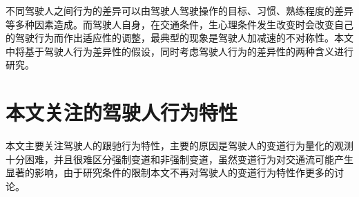 不同驾驶人之间行为的差异可以由驾驶人驾驶操作的目标、习惯、熟练程度的差异等多种因素造成。而驾驶人自身，在交通条件，生心理条件发生改变时会改变自己的驾驶行为而作出适应性的调整，最典型的现象是驾驶人加减速的不对称性。本文中将基于驾驶人行为差异性的假设，同时考虑驾驶人行为的差异性的两种含义进行研究。
%
%
%
%
%
%

\section{本文关注的驾驶人行为特性}

本文主要关注驾驶人的跟驰行为特性，主要的原因是驾驶人的变道行为量化的观测十分困难，并且很难区分强制变道和非强制变道，虽然变道行为对交通流可能产生显著的影响，由于研究条件的限制本文不再对驾驶人的变道行为特性作更多的讨论。

